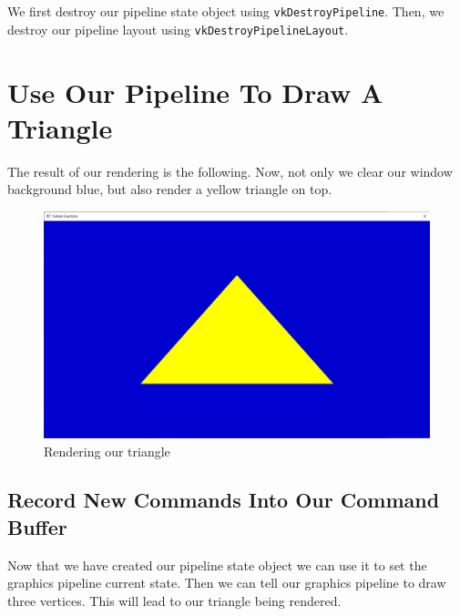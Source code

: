 We first destroy our pipeline state object using \texttt{vkDestroyPipeline}.
Then, we destroy our pipeline layout using \texttt{vkDestroyPipelineLayout}.

\section{Use Our Pipeline To Draw A Triangle}

The result of our rendering is the following.
Now, not only we clear our window background blue, but also render
a yellow triangle on top.

\begin{figure}[ht]
    \centering
    \includegraphics[scale=0.20]{images/ChTriangle/Triangle.png}
    \caption{Rendering our triangle}
    \label{fig::RenderTriangle}
\end{figure}

\subsection{Record New Commands Into Our Command Buffer}

Now that we have created our pipeline state object we can use it
to set the graphics pipeline current state.
Then we can tell our graphics pipeline to draw three vertices.
This will lead to our triangle being rendered.

\begin{minipage}{\linewidth}{\noindent}
    
\end{minipage}
